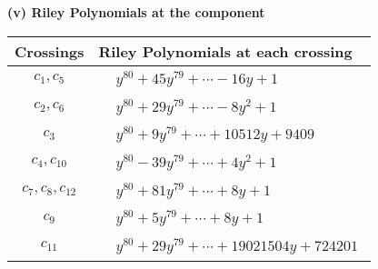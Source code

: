 \documentclass[1p]{elsarticle_modified}
\theoremstyle{definition}
\begin{document}
\newpage\renewcommand{\arraystretch}{1}
\flushleft \textbf{(v) Riley Polynomials at the component}\newline \\
\begin{tabular}{m{50pt}|m{274pt}}
Crossings & \hspace{64pt}Riley Polynomials at each crossing \\
\hline $$\begin{aligned}c_{1},c_{5}\end{aligned}$$&$\begin{aligned}
&y^{80}+45 y^{79}+\cdots-16 y+1
\end{aligned}$\\
\hline $$\begin{aligned}c_{2},c_{6}\end{aligned}$$&$\begin{aligned}
&y^{80}+29 y^{79}+\cdots-8 y^2+1
\end{aligned}$\\
\hline $$\begin{aligned}c_{3}\end{aligned}$$&$\begin{aligned}
&y^{80}+9 y^{79}+\cdots+10512 y+9409
\end{aligned}$\\
\hline $$\begin{aligned}c_{4},c_{10}\end{aligned}$$&$\begin{aligned}
&y^{80}-39 y^{79}+\cdots+4 y^2+1
\end{aligned}$\\
\hline $$\begin{aligned}c_{7},c_{8},c_{12}\end{aligned}$$&$\begin{aligned}
&y^{80}+81 y^{79}+\cdots+8 y+1
\end{aligned}$\\
\hline $$\begin{aligned}c_{9}\end{aligned}$$&$\begin{aligned}
&y^{80}+5 y^{79}+\cdots+8 y+1
\end{aligned}$\\
\hline $$\begin{aligned}c_{11}\end{aligned}$$&$\begin{aligned}
&y^{80}+29 y^{79}+\cdots+19021504 y+724201
\end{aligned}$\\
\hline
\end{tabular}\\~\\
\end{document}
